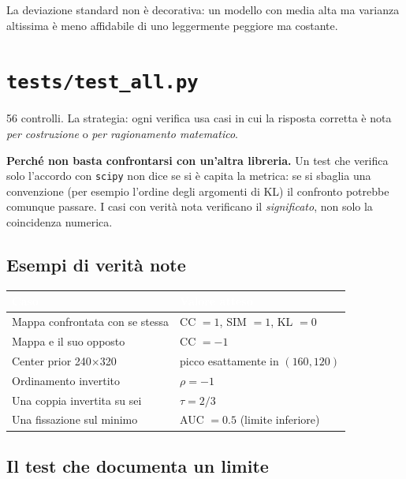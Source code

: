 La deviazione standard non è decorativa: un modello con media alta ma varianza altissima è meno
affidabile di uno leggermente peggiore ma costante.

\section{\texttt{tests/test\_all.py}}

56 controlli. La strategia: ogni verifica usa casi in cui la risposta corretta è nota
\emph{per costruzione} o \emph{per ragionamento matematico}.

\begin{nota}
\textbf{Perché non basta confrontarsi con un'altra libreria.} Un test che verifica solo l'accordo
con \texttt{scipy} non dice se si è capita la metrica: se si sbaglia una convenzione (per esempio
l'ordine degli argomenti di KL) il confronto potrebbe comunque passare. I casi con verità nota
verificano il \emph{significato}, non solo la coincidenza numerica.
\end{nota}

\subsection{Esempi di verità note}

\begin{center}
\begin{tabular}{l l}
\toprule
\rowcolor{tblHead}\textcolor{white}{\textbf{Caso}} & \textcolor{white}{\textbf{Valore atteso}} \\
\midrule
Mappa confrontata con se stessa & CC $=1$, SIM $=1$, KL $=0$ \\
\rowcolor{tblAlt} Mappa e il suo opposto & CC $=-1$ \\
Center prior 240$\times$320 & picco esattamente in $(160, 120)$ \\
\rowcolor{tblAlt} Ordinamento invertito & $\rho = -1$ \\
Una coppia invertita su sei & $\tau = 2/3$ \\
\rowcolor{tblAlt} Una fissazione sul minimo & AUC $= 0.5$ (limite inferiore) \\
\bottomrule
\end{tabular}
\end{center}

\subsection{Il test che documenta un limite}

